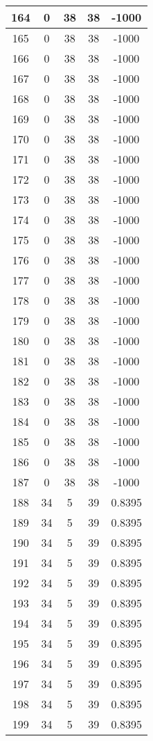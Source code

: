 \documentclass[letterpaper, 12pt]{article}
\begin{document}
\begin{longtable}{|c|c|c|c|c|}
164 & 0 & 38 & 38 & -1000 \\
\hline
165 & 0 & 38 & 38 & -1000 \\
\hline
166 & 0 & 38 & 38 & -1000 \\
\hline
167 & 0 & 38 & 38 & -1000 \\
\hline
168 & 0 & 38 & 38 & -1000 \\
\hline
169 & 0 & 38 & 38 & -1000 \\
\hline
170 & 0 & 38 & 38 & -1000 \\
\hline
171 & 0 & 38 & 38 & -1000 \\
\hline
172 & 0 & 38 & 38 & -1000 \\
\hline
173 & 0 & 38 & 38 & -1000 \\
\hline
174 & 0 & 38 & 38 & -1000 \\
\hline
175 & 0 & 38 & 38 & -1000 \\
\hline
176 & 0 & 38 & 38 & -1000 \\
\hline
177 & 0 & 38 & 38 & -1000 \\
\hline
178 & 0 & 38 & 38 & -1000 \\
\hline
179 & 0 & 38 & 38 & -1000 \\
\hline
180 & 0 & 38 & 38 & -1000 \\
\hline
181 & 0 & 38 & 38 & -1000 \\
\hline
182 & 0 & 38 & 38 & -1000 \\
\hline
183 & 0 & 38 & 38 & -1000 \\
\hline
184 & 0 & 38 & 38 & -1000 \\
\hline
185 & 0 & 38 & 38 & -1000 \\
\hline
186 & 0 & 38 & 38 & -1000 \\
\hline
187 & 0 & 38 & 38 & -1000 \\
\hline
188 & 34 & 5 & 39 & 0.8395 \\
\hline
189 & 34 & 5 & 39 & 0.8395 \\
\hline
190 & 34 & 5 & 39 & 0.8395 \\
\hline
191 & 34 & 5 & 39 & 0.8395 \\
\hline
192 & 34 & 5 & 39 & 0.8395 \\
\hline
193 & 34 & 5 & 39 & 0.8395 \\
\hline
194 & 34 & 5 & 39 & 0.8395 \\
\hline
195 & 34 & 5 & 39 & 0.8395 \\
\hline
196 & 34 & 5 & 39 & 0.8395 \\
\hline
197 & 34 & 5 & 39 & 0.8395 \\
\hline
198 & 34 & 5 & 39 & 0.8395 \\
\hline
199 & 34 & 5 & 39 & 0.8395 \\
\hline
\end{longtable}
\end{document}
